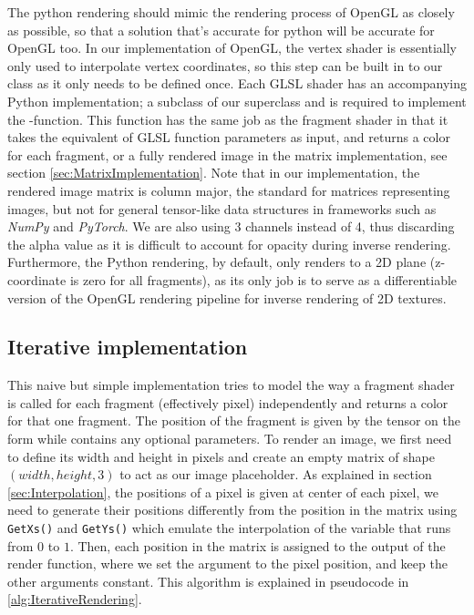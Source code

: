 The python rendering should mimic the rendering process of OpenGL as closely as possible, so that a solution that's accurate for python will be accurate for OpenGL too. In our implementation of OpenGL, the vertex shader is essentially only used to interpolate vertex coordinates, so this step can be built in to our  class as it only needs to be defined once. Each GLSL shader has an accompanying Python implementation; a subclass of our  superclass and is required to implement the -function. This function has the same job as the fragment shader in that it takes the equivalent of GLSL function parameters as input, and returns a color for each fragment, or a fully rendered image in the matrix implementation, see section \ref{sec:MatrixImplementation}. Note that in our implementation, the rendered image matrix is column major, the standard for matrices representing images, but not for general tensor-like data structures in frameworks such as \textit{NumPy} and \textit{PyTorch}. We are also using 3 channels instead of 4, thus discarding the alpha value as it is difficult to account for opacity during inverse rendering. Furthermore, the Python rendering, by default, only renders to a 2D plane (z-coordinate is zero for all fragments), as its only job is to serve as a differentiable version of the OpenGL rendering pipeline for inverse rendering of 2D textures.

\subsection{Iterative implementation}\label{sec:IterativeImplementation}

This naive but simple implementation tries to model the way a fragment shader is called for each fragment (effectively pixel) independently and returns a color for that one fragment. The position of the fragment is given by the tensor  on the form  while  contains any optional parameters. To render an image, we first need to define its width and height in pixels and create an empty matrix of shape $(width, height, 3)$ to act as our image placeholder. As explained in section \ref{sec:Interpolation}, the positions of a pixel is given at center of each pixel, we need to generate their positions differently from the position in the matrix using \texttt{GetXs()} and \texttt{GetYs()} which emulate the interpolation of the  variable that runs from $0$ to $1$. Then, each position in the matrix is assigned to the output of the render function, where we set the  argument to the pixel position, and keep the other arguments constant. This algorithm is explained in pseudocode in \ref{alg:IterativeRendering}. 

